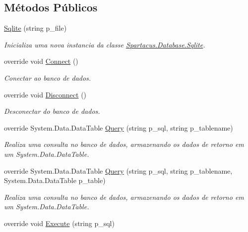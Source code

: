 \subsection*{Métodos Públicos}
\begin{DoxyCompactItemize}
\item 
\hyperlink{classSpartacus_1_1Database_1_1Sqlite_ac093bc658547c155306908a97e7e725d}{Sqlite} (string p\+\_\+file)
\begin{DoxyCompactList}\small\item\em Inicializa uma nova instancia da classe \hyperlink{classSpartacus_1_1Database_1_1Sqlite}{Spartacus.\+Database.\+Sqlite}. \end{DoxyCompactList}\item 
override void \hyperlink{classSpartacus_1_1Database_1_1Sqlite_a7bbbff1d7f1b76d0545cc6fd7ce03c32}{Connect} ()
\begin{DoxyCompactList}\small\item\em Conectar ao banco de dados. \end{DoxyCompactList}\item 
override void \hyperlink{classSpartacus_1_1Database_1_1Sqlite_a1ecb802399c8b374d23edaf4237ce667}{Disconnect} ()
\begin{DoxyCompactList}\small\item\em Desconectar do banco de dados. \end{DoxyCompactList}\item 
override System.\+Data.\+Data\+Table \hyperlink{classSpartacus_1_1Database_1_1Sqlite_a6b452dd40baf4fb82f3cf1dc2b5adef2}{Query} (string p\+\_\+sql, string p\+\_\+tablename)
\begin{DoxyCompactList}\small\item\em Realiza uma consulta no banco de dados, armazenando os dados de retorno em um System.\+Data.\+Data\+Table. \end{DoxyCompactList}\item 
override System.\+Data.\+Data\+Table \hyperlink{classSpartacus_1_1Database_1_1Sqlite_a935c96905011800e4df8ad0a7ca9bcf3}{Query} (string p\+\_\+sql, string p\+\_\+tablename, System.\+Data.\+Data\+Table p\+\_\+table)
\begin{DoxyCompactList}\small\item\em Realiza uma consulta no banco de dados, armazenando os dados de retorno em um System.\+Data.\+Data\+Table. \end{DoxyCompactList}\item 
override void \hyperlink{classSpartacus_1_1Database_1_1Sqlite_adb68d4ddb00d814f9741ec87e88d788a}{Execute} (string p\+\_\+sql)

\end{DoxyCompactItemize}
